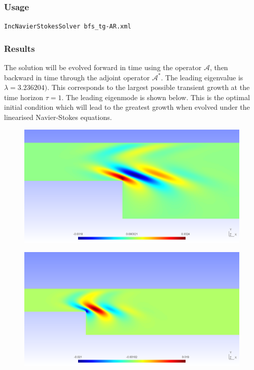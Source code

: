 \subsubsection{Usage}

\texttt{IncNavierStokesSolver bfs\_tg-AR.xml}

\subsubsection{Results}

The solution will be evolved forward in time using the operator $\mathcal{A}$, then backward in time through the adjoint operator $\mathcal{A}^*$. The leading eigenvalue is $\lambda= 3.236204)$. This corresponds to the largest possible transient growth at the time horizon $\tau= 1$. The leading eigenmode is shown below. This is the optimal initial condition which will lead to the greatest growth when evolved under the linearised Navier-Stokes equations.


\begin{figure}[!htbp]
\centering
 {\includegraphics[width=1 \textwidth]{img/bfs_eig_u}}
   \caption {}
\end{figure}

\begin{figure}[!htbp]
\centering
 {\includegraphics[width=1 \textwidth]{img/bfs_eig_v}}
    \caption {}
\end{figure}

